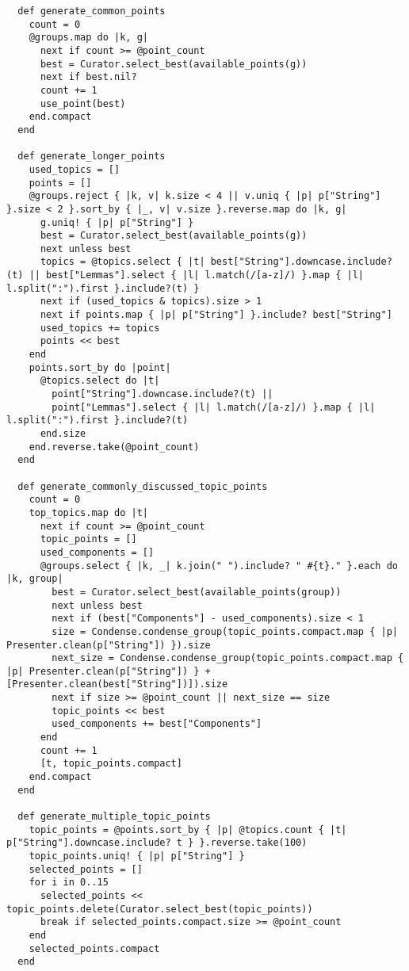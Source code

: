 \documentclass{article}
\begin{document}
\begin{verbatim}
  def generate_common_points
    count = 0
    @groups.map do |k, g|
      next if count >= @point_count
      best = Curator.select_best(available_points(g))
      next if best.nil?
      count += 1
      use_point(best)
    end.compact
  end

  def generate_longer_points
    used_topics = []
    points = []
    @groups.reject { |k, v| k.size < 4 || v.uniq { |p| p["String"] }.size < 2 }.sort_by { |_, v| v.size }.reverse.map do |k, g|
      g.uniq! { |p| p["String"] }
      best = Curator.select_best(available_points(g))
      next unless best
      topics = @topics.select { |t| best["String"].downcase.include?(t) || best["Lemmas"].select { |l| l.match(/[a-z]/) }.map { |l| l.split(":").first }.include?(t) }
      next if (used_topics & topics).size > 1
      next if points.map { |p| p["String"] }.include? best["String"]
      used_topics += topics
      points << best
    end
    points.sort_by do |point|
      @topics.select do |t|
        point["String"].downcase.include?(t) ||
        point["Lemmas"].select { |l| l.match(/[a-z]/) }.map { |l| l.split(":").first }.include?(t)
      end.size
    end.reverse.take(@point_count)
  end

  def generate_commonly_discussed_topic_points
    count = 0
    top_topics.map do |t|
      next if count >= @point_count
      topic_points = []
      used_components = []
      @groups.select { |k, _| k.join(" ").include? " #{t}." }.each do |k, group|
        best = Curator.select_best(available_points(group))
        next unless best
        next if (best["Components"] - used_components).size < 1
        size = Condense.condense_group(topic_points.compact.map { |p| Presenter.clean(p["String"]) }).size
        next_size = Condense.condense_group(topic_points.compact.map { |p| Presenter.clean(p["String"]) } + [Presenter.clean(best["String"])]).size
        next if size >= @point_count || next_size == size
        topic_points << best
        used_components += best["Components"]
      end
      count += 1
      [t, topic_points.compact]
    end.compact
  end

  def generate_multiple_topic_points
    topic_points = @points.sort_by { |p| @topics.count { |t| p["String"].downcase.include? t } }.reverse.take(100)
    topic_points.uniq! { |p| p["String"] }
    selected_points = []
    for i in 0..15
      selected_points << topic_points.delete(Curator.select_best(topic_points))
      break if selected_points.compact.size >= @point_count
    end
    selected_points.compact
  end


\end{verbatim}
\end{document}
